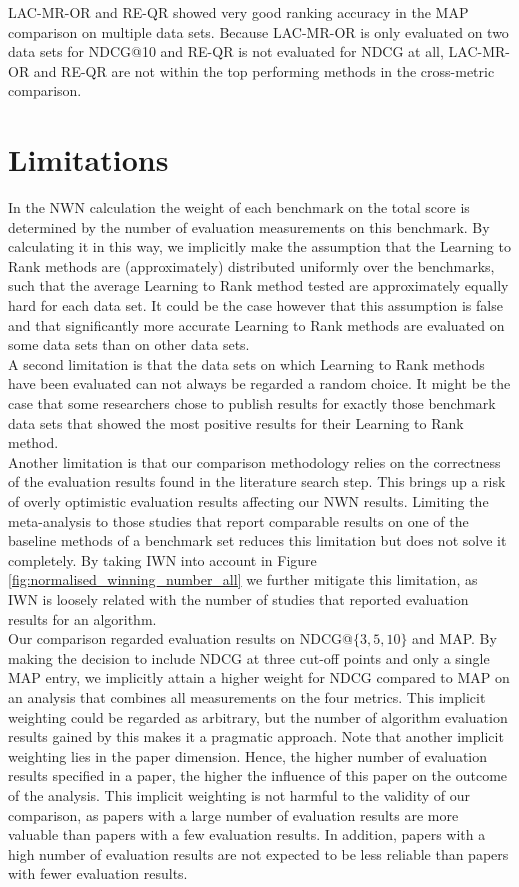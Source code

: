 LAC-MR-OR and RE-QR showed very good ranking accuracy in the \ac{MAP} comparison on multiple data sets. Because LAC-MR-OR is only evaluated on two data sets for \ac{NDCG}@10 and RE-QR is not evaluated for \ac{NDCG} at all, LAC-MR-OR and RE-QR are not within the top performing methods in the cross-metric comparison. 

\section{Limitations}
In the \ac{NWN} calculation the weight of each benchmark on the total score is determined by the number of evaluation measurements on this benchmark. By calculating it in this way, we implicitly make the assumption that the Learning to Rank methods are (approximately) distributed uniformly over the benchmarks, such that the average Learning to Rank method tested are approximately equally hard for each data set. It could be the case however that this assumption is false and that significantly more accurate Learning to Rank methods are evaluated on some data sets than on other data sets. \\

A second limitation is that the data sets on which Learning to Rank methods have been evaluated can not always be regarded a random choice. It might be the case that some researchers chose to publish results for exactly those benchmark data sets that showed the most positive results for their Learning to Rank method.\\

Another limitation is that our comparison methodology relies on the correctness of the evaluation results found in the literature search step. This brings up a risk of overly optimistic evaluation results affecting our NWN results. Limiting the meta-analysis to those studies that report comparable results on one of the baseline methods of a benchmark set reduces this limitation but does not solve it completely. By taking IWN into account in Figure \ref{fig:normalised_winning_number_all} we further mitigate this limitation, as IWN is loosely related with the number of studies that reported evaluation results for an algorithm.\\

Our comparison regarded evaluation results on \ac{NDCG}@$\{3,5,10\}$ and \ac{MAP}. By making the decision to include \ac{NDCG} at three cut-off points and only a single \ac{MAP} entry, we implicitly attain a higher weight for \ac{NDCG} compared to \ac{MAP} on an analysis that combines all measurements on the four metrics. This implicit weighting could be regarded as arbitrary, but the number of algorithm evaluation results gained by this makes it a pragmatic approach. Note that another implicit weighting lies in the paper dimension. Hence, the higher number of evaluation results specified in a paper, the higher the influence of this paper on the outcome of the analysis. This implicit weighting is not harmful to the validity of our comparison, as papers with a large number of evaluation results are more valuable than papers with a few evaluation results. In addition, papers with a high number of evaluation results are not expected to be less reliable than papers with fewer evaluation results.

